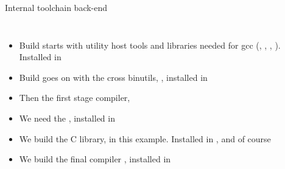 \begin{frame}{Internal toolchain back-end}

\begin{columns}
  \begin{itemize}
    \footnotesize
  \item Build starts with utility host tools and libraries needed for
    gcc (, , ,
    ). Installed in
  \item Build goes on with the cross binutils, ,
    installed in 
  \item Then the first stage compiler, 
  \item We need the , installed in
  \item We build the C library,  in this example. Installed
    in , 
    and of course 
  \item We build the final compiler , installed
    in 
  \end{itemize}

\end{columns}
\end{frame}
